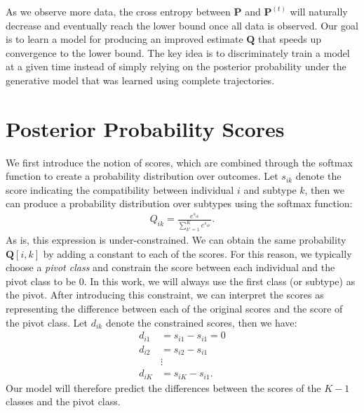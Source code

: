 \documentclass[12pt]{article}
\newcommand{\psup}[1]{^{(#1)}}
\begin{document}
As we observe more data, the cross entropy between $\bm{P}$ and $\bm{P}\psup{t}$ will naturally decrease and eventually reach the lower bound once all data is observed. Our goal is to learn a model for producing an improved estimate $\bm{Q}$ that speeds up convergence to the lower bound. The key idea is to discriminately train a model at a given time instead of simply relying on the posterior probability under the generative model that was learned using complete trajectories.

\section{Posterior Probability Scores}

We first introduce the notion of scores, which are combined through the softmax function to create a probability distribution over outcomes. Let $s_{ik}$ denote the score indicating the compatibility between individual $i$ and subtype $k$, then we can produce a probability distribution over subtypes using the softmax function:
\begin{align}
Q_{ik} = \frac{ e^{s_{ik}} }{\sum_{k'=1}^K e^{s_{ik'}} }.
\end{align}
As is, this expression is under-constrained. We can obtain the same probability $\bm{Q}[i,k]$ by adding a constant to each of the scores. For this reason, we typically choose a \emph{pivot class} and constrain the score between each individual and the pivot class to be $0$. In this work, we will always use the first class (or subtype) as the pivot. After introducing this constraint, we can interpret the scores as representing the difference between each of the original scores and the score of the pivot class. Let $d_{ik}$ denote the constrained scores, then we have:
\begin{align}
d_{i1} &= s_{i1} - s_{i1} = 0 \\
d_{i2} &= s_{i2} - s_{i1}     \\
       &\vdots                \\
d_{iK} &= s_{iK} - s_{i1}.
\end{align}
Our model will therefore predict the differences between the scores of the $K - 1$ classes and the pivot class.
\end{document}
